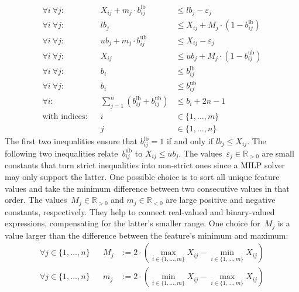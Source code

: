 \begin{equation}
	\begin{aligned}
		\forall i~\forall j: & & X_{ij} + m_j \cdot b^{\text{lb}}_{ij} &\leq \mathit{lb}_j - \varepsilon_j \\
		\forall i~\forall j: & & \mathit{lb}_j &\leq X_{ij} + M_j \cdot \left(1 - b^{\text{lb}}_{ij} \right) \\
		\forall i~\forall j: & & \mathit{ub}_j + m_j \cdot b^{\text{ub}}_{ij} &\leq X_{ij} - \varepsilon_j \\
		\forall i~\forall j: & & X_{ij} &\leq \mathit{ub}_j + M_j \cdot \left(1 - b^{\text{ub}}_{ij} \right) \\
		\forall i~\forall j: & & b_i &\leq b^{\text{lb}}_{ij} \\
		\forall i~\forall j: & & b_i &\leq b^{\text{ub}}_{ij} \\
		\forall i: & & \sum_{j=1}^{n} \left( b^{\text{lb}}_{ij} + b^{\text{ub}}_{ij} \right) &\leq b_i + 2n - 1 \\
		\text{with indices:} & & i &\in \{1, \dots, m\} \\
		& & j &\in \{1, \dots, n\}
	\end{aligned}
	\label{eq:csd:milp-constraint-subgroup-membership}
\end{equation}
%
The first two inequalities ensure that $b^{\text{lb}}_{ij} = 1$ if and only if $\mathit{lb}_j \leq X_{ij}$.
The following two inequalities relate~$b^{\text{ub}}_{ij}$ to $X_{ij} \leq \mathit{ub}_j$.
The values~$\varepsilon_j \in \mathbb{R}_{> 0}$ are small constants that turn strict inequalities into non-strict ones since a MILP solver may only support the latter.
One possible choice is to sort all unique feature values and take the minimum difference between two consecutive values in that order.
The values~$M_j \in \mathbb{R}_{> 0}$ and $m_j \in \mathbb{R}_{< 0}$ are large positive and negative constants, respectively.
They help to connect real-valued and binary-valued expressions, compensating for the latter's smaller range.
One choice for~$M_j$ is a value larger than the difference between the feature's minimum and maximum:
%
\begin{equation}
	\begin{aligned}
		\forall j \in \{1, \dots, n\} & & M_j &:= 2 \cdot \left( \max_{i \in \{1, \dots, m\}} X_{ij} - \min_{i \in \{1, \dots, m\}} X_{ij} \right) \\
		\forall j \in \{1, \dots, n\} & & m_j &:= 2 \cdot \left( \min_{i \in \{1, \dots, m\}} X_{ij} - \max_{i \in \{1, \dots, m\}} X_{ij} \right) \\
	\end{aligned}
	\label{eq:csd:milp-big-m}
\end{equation}
